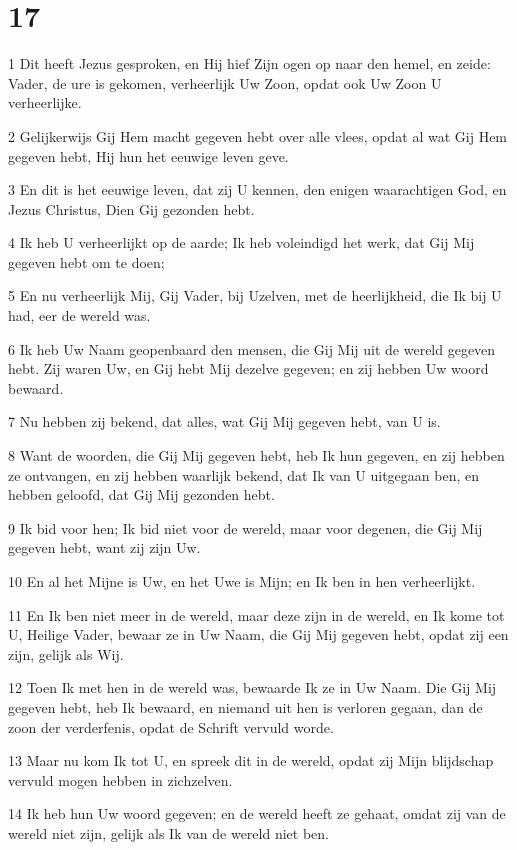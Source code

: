 \chapter{17}

\par 1 Dit heeft Jezus gesproken, en Hij hief Zijn ogen op naar den hemel, en zeide: Vader, de ure is gekomen, verheerlijk Uw Zoon, opdat ook Uw Zoon U verheerlijke.
\par 2 Gelijkerwijs Gij Hem macht gegeven hebt over alle vlees, opdat al wat Gij Hem gegeven hebt, Hij hun het eeuwige leven geve.
\par 3 En dit is het eeuwige leven, dat zij U kennen, den enigen waarachtigen God, en Jezus Christus, Dien Gij gezonden hebt.
\par 4 Ik heb U verheerlijkt op de aarde; Ik heb voleindigd het werk, dat Gij Mij gegeven hebt om te doen;
\par 5 En nu verheerlijk Mij, Gij Vader, bij Uzelven, met de heerlijkheid, die Ik bij U had, eer de wereld was.
\par 6 Ik heb Uw Naam geopenbaard den mensen, die Gij Mij uit de wereld gegeven hebt. Zij waren Uw, en Gij hebt Mij dezelve gegeven; en zij hebben Uw woord bewaard.
\par 7 Nu hebben zij bekend, dat alles, wat Gij Mij gegeven hebt, van U is.
\par 8 Want de woorden, die Gij Mij gegeven hebt, heb Ik hun gegeven, en zij hebben ze ontvangen, en zij hebben waarlijk bekend, dat Ik van U uitgegaan ben, en hebben geloofd, dat Gij Mij gezonden hebt.
\par 9 Ik bid voor hen; Ik bid niet voor de wereld, maar voor degenen, die Gij Mij gegeven hebt, want zij zijn Uw.
\par 10 En al het Mijne is Uw, en het Uwe is Mijn; en Ik ben in hen verheerlijkt.
\par 11 En Ik ben niet meer in de wereld, maar deze zijn in de wereld, en Ik kome tot U, Heilige Vader, bewaar ze in Uw Naam, die Gij Mij gegeven hebt, opdat zij een zijn, gelijk als Wij.
\par 12 Toen Ik met hen in de wereld was, bewaarde Ik ze in Uw Naam. Die Gij Mij gegeven hebt, heb Ik bewaard, en niemand uit hen is verloren gegaan, dan de zoon der verderfenis, opdat de Schrift vervuld worde.
\par 13 Maar nu kom Ik tot U, en spreek dit in de wereld, opdat zij Mijn blijdschap vervuld mogen hebben in zichzelven.
\par 14 Ik heb hun Uw woord gegeven; en de wereld heeft ze gehaat, omdat zij van de wereld niet zijn, gelijk als Ik van de wereld niet ben.
